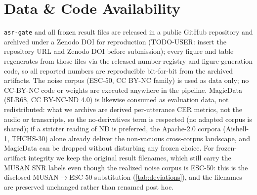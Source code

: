 \documentclass[11pt]{article}
\begin{document}
\section*{Data \& Code Availability}
\texttt{asr-gate} and all frozen result files are released in a public GitHub
repository and archived under a Zenodo DOI for reproduction
(TODO-USER: insert the repository URL and Zenodo DOI before submission); every
figure and table regenerates from those files via the released number-registry and
figure-generation code, so all reported numbers are reproducible bit-for-bit
from the archived artifacts. The noise corpus (ESC-50, CC BY-NC family) is used as data
only; no CC-BY-NC code or weights are executed anywhere in the pipeline. MagicData (SLR68,
CC BY-NC-ND 4.0) is likewise consumed as evaluation data, not redistributed: what we archive
are derived per-utterance CER metrics, not the audio or transcripts, so the
no-derivatives term is respected (no adapted corpus is shared); if a stricter reading of ND
is preferred, the Apache-2.0 corpora (Aishell-1, THCHS-30) alone already deliver the
non-vacuous cross-corpus landscape, and MagicData can be dropped without disturbing any
frozen choice. For frozen-artifact
integrity we keep the original result filenames, which still carry the MUSAN SNR labels
even though the realized noise corpus is ESC-50: this is the disclosed MUSAN$\to$ESC-50
substitution (\cref{tab:deviations}), and the filenames are preserved unchanged rather than
renamed post hoc.



\end{document}
